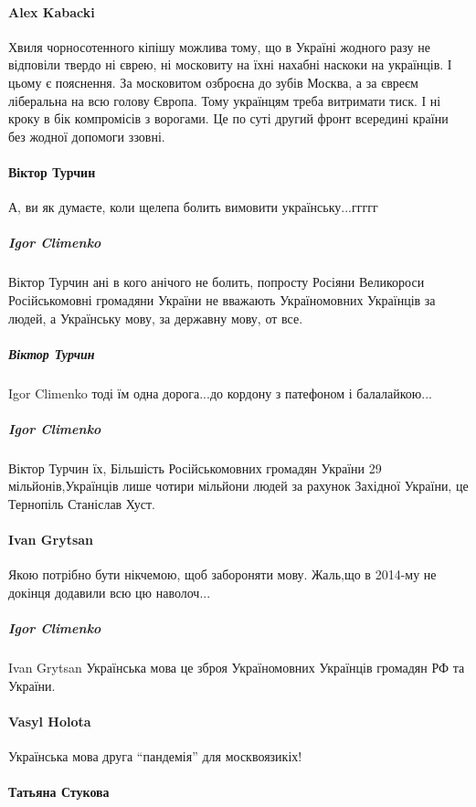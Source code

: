\paragraph{Alex Kabacki}

Хвиля чорносотенного кіпішу можлива тому, що в Україні жодного разу не
відповіли твердо ні єврею, ні московиту на їхні нахабні наскоки на українців. І
цьому є пояснення. За московитом озброєна до зубів Москва, а за євреєм
ліберальна на всю голову Європа. Тому українцям треба витримати тиск. І ні
кроку в бік компромісів з ворогами. Це по суті другий фронт всередині країни
без жодної допомоги ззовні.

\paragraph{Віктор Турчин}

А, ви як думаєте, коли щелепа болить вимовити українську...ггггг

\subparagraph{Igor Climenko}

Віктор Турчин ані в кого анічого не болить, попросту Росіяни Великороси
Російськомовні громадяни України не вважають Україномовних Українців за людей,
а Українську мову, за державну мову, от все.

\subparagraph{Віктор Турчин}
Igor Climenko
тоді їм одна дорога...до кордону з патефоном і балалайкою...

\subparagraph{Igor Climenko}
Віктор Турчин їх, Більшість Російськомовних громадян України 29 мільйонів,Українців лише чотири мільйони людей за рахунок Західної України, це Тернопіль Станіслав Хуст.

\paragraph{Ivan Grytsan}
Якою потрібно бути нікчемою, щоб забороняти мову. Жаль,що в 2014-му не докінця додавили всю цю наволоч... 

\subparagraph{Igor Climenko}
Ivan Grytsan Українська мова це зброя Україномовних Українців громадян РФ та України.

\paragraph{Vasyl Holota}
Українська мова друга \enquote{пандемія} для москвоязикіх!

\paragraph{Татьяна Стукова}

